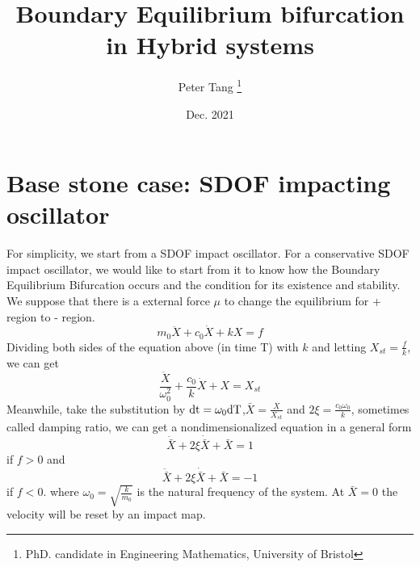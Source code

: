 \documentclass[a4paper,10pt]{article}
\title{Boundary Equilibrium bifurcation in Hybrid systems}
\author{Peter Tang \thanks{PhD. candidate in Engineering Mathematics, University of Bristol}}
\date{Dec. 2021}
\begin{document}
	\maketitle
	\tableofcontents
	\listoffigures
	\listoftables
	\clearpage
	\section{Base stone case: SDOF impacting oscillator}
	For simplicity, we start from a SDOF impact oscillator. For a conservative SDOF impact oscillator, we would like to start from it to know how the Boundary Equilibrium Bifurcation occurs and the condition for its existence and stability. We suppose that there is a external force $\mu$ to change the equilibrium for + region to - region.  
	\begin{equation}
	m_0 \ddot{X} + c_0 \dot{X} + k X =f
	\end{equation}
	Dividing both sides of the equation above (in time T) with $k$ and letting $X_{st}=\frac{f}{k}$, we can get 
	\begin{equation}
	\frac{\ddot{X}}{\omega^{2}_0}+\frac{c_0}{k}\dot{X}+X=X_{st}
	\label{eq:2}
	\end{equation}
	Meanwhile, take the substitution by $ \displaystyle  \rm{d} t= \omega_0 \rm{d} T$,$ \displaystyle  \bar X=\frac{X}{X_{st}}$ and $ \displaystyle 2\xi=\frac{c_0\omega_0}{k}$, sometimes called damping ratio, we can get a nondimensionalized  equation in a general form
	\begin{equation}
	\ddot{\bar{X}} +2\xi \dot{\bar{X}}+ \bar{X}=1
	\label{eq:nondim Equi1}
	\end{equation} if $f>0$ and 
	\begin{equation}
	\ddot{\bar{X}} +2\xi \dot{\bar{X}}+ \bar{X}=-1
	\label{eq:nondim Equi2}
	\end{equation} if $f<0$.
	where $ \displaystyle \omega_0=\sqrt{\frac{k}{m_0}}$ is the natural frequency of the system.
	At $\bar X=0$ the velocity will be reset by an impact map. 
	
	
	
\end{document}
